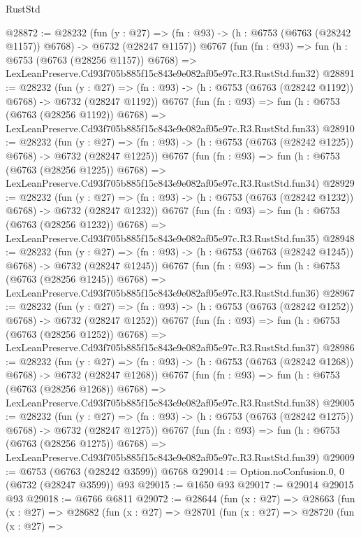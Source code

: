 \begin{lexlean}{RustStd}
\begin{coremodule}
@28872 := @28232
    (fun (y : @27) =>
    (fn : @93) -> (h : @6753 (@6763 (@28242 @1157)) @6768) -> @6732 (@28247 @1157))
    @6767
    (fun (fn : @93) =>
    fun (h : @6753 (@6763 (@28256 @1157)) @6768) =>
    LexLeanPreserve.Cd93f705b885f15c843e9e082af05e97c.R3.RustStd.fun32)
@28891 := @28232
    (fun (y : @27) =>
    (fn : @93) -> (h : @6753 (@6763 (@28242 @1192)) @6768) -> @6732 (@28247 @1192))
    @6767
    (fun (fn : @93) =>
    fun (h : @6753 (@6763 (@28256 @1192)) @6768) =>
    LexLeanPreserve.Cd93f705b885f15c843e9e082af05e97c.R3.RustStd.fun33)
@28910 := @28232
    (fun (y : @27) =>
    (fn : @93) -> (h : @6753 (@6763 (@28242 @1225)) @6768) -> @6732 (@28247 @1225))
    @6767
    (fun (fn : @93) =>
    fun (h : @6753 (@6763 (@28256 @1225)) @6768) =>
    LexLeanPreserve.Cd93f705b885f15c843e9e082af05e97c.R3.RustStd.fun34)
@28929 := @28232
    (fun (y : @27) =>
    (fn : @93) -> (h : @6753 (@6763 (@28242 @1232)) @6768) -> @6732 (@28247 @1232))
    @6767
    (fun (fn : @93) =>
    fun (h : @6753 (@6763 (@28256 @1232)) @6768) =>
    LexLeanPreserve.Cd93f705b885f15c843e9e082af05e97c.R3.RustStd.fun35)
@28948 := @28232
    (fun (y : @27) =>
    (fn : @93) -> (h : @6753 (@6763 (@28242 @1245)) @6768) -> @6732 (@28247 @1245))
    @6767
    (fun (fn : @93) =>
    fun (h : @6753 (@6763 (@28256 @1245)) @6768) =>
    LexLeanPreserve.Cd93f705b885f15c843e9e082af05e97c.R3.RustStd.fun36)
@28967 := @28232
    (fun (y : @27) =>
    (fn : @93) -> (h : @6753 (@6763 (@28242 @1252)) @6768) -> @6732 (@28247 @1252))
    @6767
    (fun (fn : @93) =>
    fun (h : @6753 (@6763 (@28256 @1252)) @6768) =>
    LexLeanPreserve.Cd93f705b885f15c843e9e082af05e97c.R3.RustStd.fun37)
@28986 := @28232
    (fun (y : @27) =>
    (fn : @93) -> (h : @6753 (@6763 (@28242 @1268)) @6768) -> @6732 (@28247 @1268))
    @6767
    (fun (fn : @93) =>
    fun (h : @6753 (@6763 (@28256 @1268)) @6768) =>
    LexLeanPreserve.Cd93f705b885f15c843e9e082af05e97c.R3.RustStd.fun38)
@29005 := @28232
    (fun (y : @27) =>
    (fn : @93) -> (h : @6753 (@6763 (@28242 @1275)) @6768) -> @6732 (@28247 @1275))
    @6767
    (fun (fn : @93) =>
    fun (h : @6753 (@6763 (@28256 @1275)) @6768) =>
    LexLeanPreserve.Cd93f705b885f15c843e9e082af05e97c.R3.RustStd.fun39)
@29009 := @6753 (@6763 (@28242 @3599)) @6768
@29014 := Option.noConfusion.{0, 0} (@6732 (@28247 @3599)) @93
@29015 := @1650 @93
@29017 := @29014 @29015 @93
@29018 := @6766 @6811
@29072 := @28644
    (fun (x : @27) =>
    @28663
      (fun (x : @27) =>
      @28682
        (fun (x : @27) =>
        @28701
          (fun (x : @27) =>
          @28720
            (fun (x : @27) =>

\end{coremodule}
\end{lexlean}

